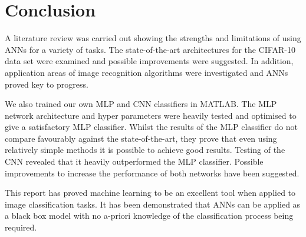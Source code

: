 \section{Conclusion}
     \pagestyle{mario}
      

A literature review was carried out showing the strengths and limitations of using ANNs for a variety of tasks. The state-of-the-art architectures for the CIFAR-10 data set were examined and possible improvements were suggested. In addition, application areas of image recognition algorithms were investigated and ANNs proved key to progress.

We also trained our own MLP and CNN classifiers in MATLAB. The MLP network architecture and hyper parameters were heavily tested and optimised to give a satisfactory MLP classifier. Whilst the results of the MLP classifier do not compare favourably against the state-of-the-art, they prove that even using relatively simple methods it is possible to achieve good results. Testing of the CNN revealed that it heavily outperformed the MLP classifier. Possible improvements to increase the performance of both networks have been suggested.

This report has proved machine learning to be an excellent tool when applied to image classification tasks. It has been demonstrated that ANNs can be applied as a black box model with no a-priori knowledge of the classification process being required.
